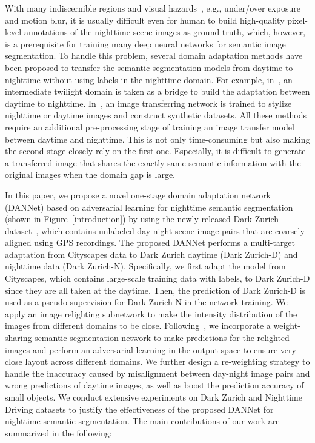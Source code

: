 \documentclass[final]{cvpr}
\begin{document}
With many indiscernible regions and visual hazards~\cite{zendel2017good}, e.g., under/over exposure and motion blur, it is usually difficult even for human to build high-quality pixel-level annotations of the nighttime scene images as ground truth, which, however, is a prerequisite for training many deep neural networks for semantic image segmentation.  
To handle this problem, several domain adaptation methods have been proposed to transfer the semantic segmentation models from daytime to nighttime without using labels in the nighttime domain. 
For example, in~\cite{dai2018dark,sakaridis2019guided,sakaridis2020map}, an intermediate twilight domain is taken as a bridge to build the adaptation between daytime to nighttime.
In~\cite{sakaridis2019guided,romera2019bridging,sun2019see,nag2019s,sakaridis2020map}, an image transferring network is trained to stylize nighttime or daytime images and construct synthetic datasets. 
All these methods require an additional pre-processing stage of training an image transfer model between daytime and nighttime.
This is not only time-consuming but also making the second stage closely rely on the first one. Especially, it is difficult to generate a transferred image that shares the exactly same semantic information with the original images when the domain gap is large.

In this paper, we propose a novel one-stage domain adaptation network (DANNet) based on adversarial learning for nighttime semantic segmentation (shown in Figure~\ref{introduction}) by using the newly released Dark Zurich dataset~\cite{sakaridis2019guided},  which contains unlabeled day-night scene image pairs that are coarsely aligned using GPS recordings.
The proposed DANNet performs a multi-target adaptation from Cityscapes data to Dark Zurich daytime  (Dark Zurich-D) and nighttime data (Dark Zurich-N). 
Specifically, we first adapt the model from Cityscapes, which contains large-scale training data with labels, to Dark Zurich-D since they are all taken at the daytime. 
Then, the prediction of Dark Zurich-D is used as a pseudo supervision for Dark Zurich-N in the network training. 
We apply an image  relighting subnetwork to make the intensity distribution of the images from different domains to be close. 
Following~\cite{tsai2018learning}, we incorporate a weight-sharing semantic segmentation network to make predictions for the relighted images and 
perform an adversarial learning in the output space to ensure very close layout across different domains. 
We further design a re-weighting strategy to handle the inaccuracy caused by misalignment between day-night image pairs and wrong predictions of daytime images, as well as 
boost the prediction accuracy of small objects. 
We conduct extensive experiments on Dark Zurich and Nighttime Driving datasets to justify the effectiveness of the proposed DANNet for nighttime semantic segmentation. The main contributions of our work are summarized in the following:
\end{document}
